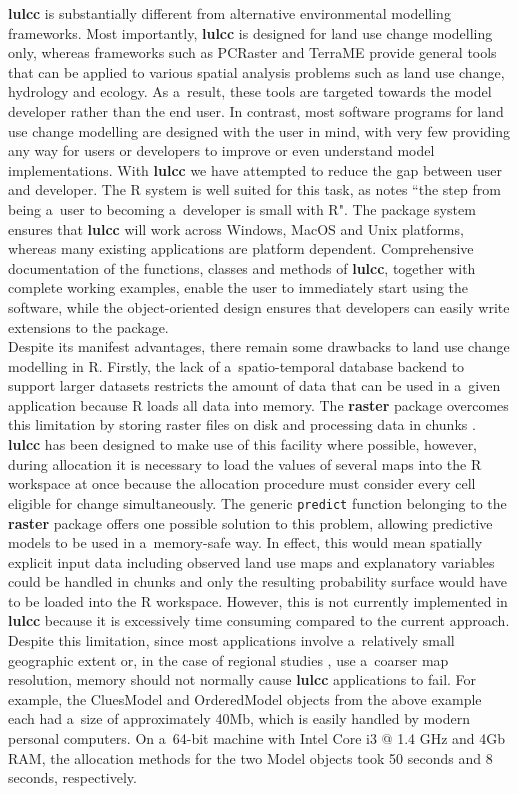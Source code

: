 \documentclass[gmdd, online, hvmath]{copernicus}
\begin{document}
\textbf{lulcc} is substantially different from alternative environmental modelling frameworks. Most importantly, \textbf{lulcc} is designed for land use change modelling only, whereas frameworks such as PCRaster and TerraME provide general tools that can be applied to various spatial analysis problems such as land use change, hydrology and ecology. As a~result, these tools are targeted towards the model developer rather than the end user. In contrast, most software programs for land use change modelling are designed with the user in mind, with very few providing any way for users or developers to improve or even understand model implementations. With \textbf{lulcc} we have attempted to reduce the gap between user and developer. The R system is well suited for this task, as \citet{pebesma2012} notes ``the step from being a~user to becoming a~developer is small with R". The package system ensures that \textbf{lulcc} will work across Windows, MacOS and Unix platforms, whereas many existing applications are platform dependent. Comprehensive documentation of the functions, classes and methods of \textbf{lulcc}, together with complete working examples, enable the user to immediately start using the software, while the object-oriented design ensures that developers can easily write extensions to the package. \\

Despite its manifest advantages, there remain some drawbacks to land use change modelling in R. Firstly, the lack of a~spatio-temporal database backend to support larger datasets \citep{gebbert2014} restricts the amount of data that can be used in a~given application because R loads all data into memory. The \textbf{raster} package overcomes this limitation by storing raster files on disk and processing data in chunks \citep{hijmans2014}. \textbf{lulcc} has been designed to make use of this facility where possible, however, during allocation it is necessary to load the values of several maps into the R workspace at once because the allocation procedure must consider every cell eligible for change simultaneously. The generic \texttt{predict} function belonging to the \textbf{raster} package offers one possible solution to this problem, allowing predictive models to be used in a~memory-safe way. In effect, this would mean spatially explicit input data including observed land use maps and explanatory variables could be handled in chunks and only the resulting probability surface would have to be loaded into the R workspace. However, this is not currently implemented in \textbf{lulcc} because it is excessively time consuming compared to the current approach. Despite this limitation, since most applications involve a~relatively small geographic extent or, in the case of regional studies \citep[e.g.][]{verburg2009,fuchs2015}, use a~coarser map resolution, memory should not normally cause \textbf{lulcc} applications to fail. For example, the CluesModel and OrderedModel objects from the above example each had a~size of approximately 40Mb, which is easily handled by modern personal computers. On a~64-bit machine with Intel Core i3 @ 1.4 GHz and 4Gb RAM, the allocation methods for the two Model objects took 50 seconds and 8 seconds, respectively. \\
\end{document}
